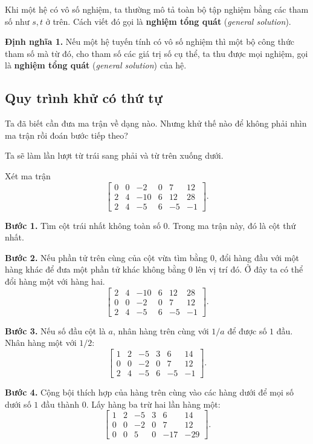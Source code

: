\documentclass[12pt,a4paper]{article}
\begin{document}
Khi một hệ có vô số nghiệm, ta thường mô tả toàn bộ tập nghiệm bằng các tham số như \(s,t\) ở trên. Cách viết đó gọi là \textbf{nghiệm tổng quát} (\emph{general solution}).

\textbf{Định nghĩa 1.} Nếu một hệ tuyến tính có vô số nghiệm thì một bộ công thức tham số mà từ đó, cho tham số các giá trị số cụ thể, ta thu được mọi nghiệm, gọi là \textbf{nghiệm tổng quát} (\emph{general solution}) của hệ.

\subsection{Quy trình khử có thứ tự}

Ta đã biết cần đưa ma trận về dạng nào. Nhưng khử thế nào để không phải nhìn ma trận rồi đoán bước tiếp theo?

Ta sẽ làm lần lượt từ trái sang phải và từ trên xuống dưới.

Xét ma trận
$$
\left[ \begin{array}{ccccc|c} 0 & 0 & -2 & 0 & 7 & 12 \\ 2 & 4 & -10 & 6 & 12 & 28 \\ 2 & 4 & -5 & 6 & -5 & -1 \end{array} \right].
$$

\textbf{Bước 1.} Tìm cột trái nhất không toàn số \(0\). Trong ma trận này, đó là cột thứ nhất.

\textbf{Bước 2.} Nếu phần tử trên cùng của cột vừa tìm bằng \(0\), đổi hàng đầu với một hàng khác để đưa một phần tử khác không bằng \(0\) lên vị trí đó. Ở đây ta có thể đổi hàng một với hàng hai.
$$
\left[ \begin{array}{ccccc|c} 2 & 4 & -10 & 6 & 12 & 28 \\ 0 & 0 & -2 & 0 & 7 & 12 \\ 2 & 4 & -5 & 6 & -5 & -1 \end{array} \right].
$$

\textbf{Bước 3.} Nếu số đầu cột là \(a\), nhân hàng trên cùng với \(1/a\) để được số \(1\) đầu. Nhân hàng một với \(1/2\):
$$
\left[ \begin{array}{ccccc|c} 1 & 2 & -5 & 3 & 6 & 14 \\ 0 & 0 & -2 & 0 & 7 & 12 \\ 2 & 4 & -5 & 6 & -5 & -1 \end{array} \right].
$$

\textbf{Bước 4.} Cộng bội thích hợp của hàng trên cùng vào các hàng dưới để mọi số dưới số \(1\) đầu thành \(0\). Lấy hàng ba trừ hai lần hàng một:
$$
\left[ \begin{array}{ccccc|c} 1 & 2 & -5 & 3 & 6 & 14 \\ 0 & 0 & -2 & 0 & 7 & 12 \\ 0 & 0 & 5 & 0 & -17 & -29 \end{array} \right].
$$
\end{document}
